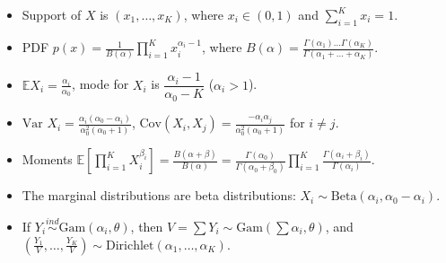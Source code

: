 \documentclass[twoside]{article}
\newcommand\bbE{\mathbb{E}}
\def\t{\theta}
\newcommand\var{\text{Var }}
\begin{document}
\begin{itemize}
\item Support of $X$ is $(x_1, \dots, x_K)$, where $x_i \in (0,1)$ and $\displaystyle\sum_{i=1}^K x_i = 1$.

\item PDF $p(x) = \displaystyle\frac{1}{B(\alpha)}\prod_{i=1}^K x_i^{\alpha_i - 1}$, where $B(\alpha) = \displaystyle\frac{\Gamma(\alpha_1)\dots \Gamma(\alpha_K)}{\Gamma(\alpha_1 + \dots + \alpha_K)}$.

\item $\bbE X_i = \displaystyle\frac{\alpha_i}{\alpha_0}$, mode for $X_i$ is $\dfrac{\alpha_i - 1}{\alpha_0 - K}$ ($\alpha_i > 1$).

\item $\var X_i = \displaystyle\frac{\alpha_i(\alpha_0 - \alpha_i)}{\alpha_0^2 (\alpha_0 + 1)}$, $\text{Cov}(X_i, X_j) = \displaystyle\frac{-\alpha_i \alpha_j}{\alpha_0^2 (\alpha_0 + 1)}$ for $i \neq j$.

\item Moments $\bbE \left[ \displaystyle\prod_{i=1}^K X_i^{\beta_i} \right] = \displaystyle\frac{B(\alpha + \beta)}{B(\alpha)} = \frac{\Gamma(\alpha_0)}{\Gamma(\alpha_0 + \beta_0)}\prod_{i=1}^K \frac{\Gamma(\alpha_i + \beta_i)}{\Gamma(\alpha_i)}$.

\item The marginal distributions are beta distributions: $X_i \sim \text{Beta}(\alpha_i, \alpha_0 - \alpha_i)$.

\item If $Y_i \stackrel{ind}{\sim} \text{Gam}(\alpha_i, \t)$, then $V = \sum Y_i \sim \text{Gam}\left(\sum \alpha_i, \t \right)$, and $\left(\displaystyle\frac{Y_1}{V}, \dots, \frac{Y_K}{V} \right) \sim \text{Dirichlet}(\alpha_1, \dots, \alpha_K)$.

\end{itemize}

\end{document}
